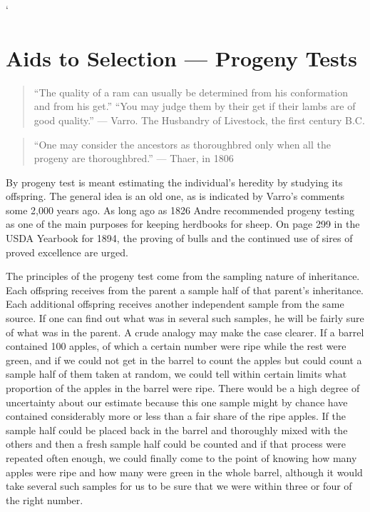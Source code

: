 `\chapter{Aids to Selection --- Progeny Tests}
\label{cha:Lush_Chapter_15}

\begin{quote}
``The quality of a ram can usually be determined from his conformation
and from his get.'' ``You may judge them by their get if
their lambs are of good quality.'' --- Varro. The Husbandry of Livestock,
the first century \textsc{B.C.}
\end{quote}

\begin{quote}
``One may consider the ancestors as thoroughbred only when
all the progeny are thoroughbred.'' --- Thaer, in 1806
\end{quote}

By progeny test is meant estimating the individual's heredity by
studying its offspring. The general idea is an old one, as is indicated by
Varro's comments some 2,000 years ago. As long ago as 1826 Andre
recommended progeny testing as one of the main purposes for keeping
herdbooks for sheep. On page 299 in the USDA Yearbook for 1894,
the proving of bulls and the continued use of sires of proved excellence
are urged.

The principles of the progeny test come from the sampling nature of
inheritance. Each offspring receives from the parent a sample half of
that parent's inheritance. Each additional offspring receives another
independent sample from the same source. If one can find out what was
in several such samples, he will be fairly sure of what was in the parent.
A crude analogy may make the case clearer. If a barrel contained 100
apples, of which a certain number were ripe while the rest were green,
and if we could not get in the barrel to count the apples but could
count a sample half of them taken at random, we could tell within certain
limits what proportion of the apples in the barrel were ripe. There
would be a high degree of uncertainty about our estimate because this
one sample might by chance have contained considerably more or less
than a fair share of the ripe apples. If the sample half could be placed
back in the barrel and thoroughly mixed with the others and then a
fresh sample half could be counted and if that process were repeated
often enough, we could finally come to the point of knowing how many
apples were ripe and how many were green in the whole barrel,
although it would take several such samples for us to be sure that we
were within three or four of the right number.

